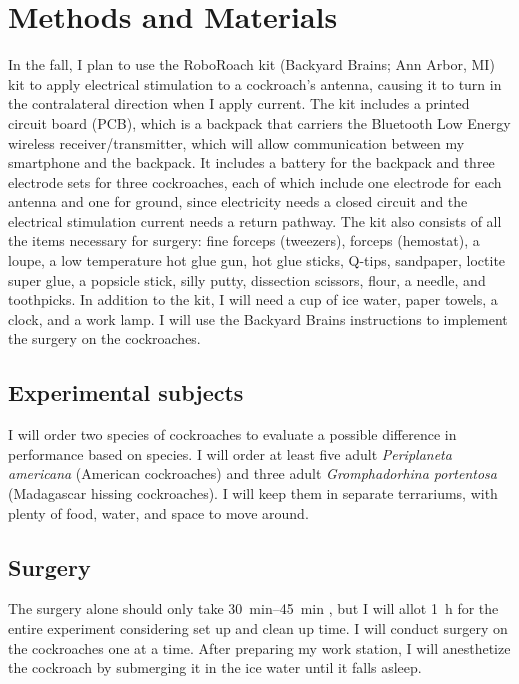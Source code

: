 \section{Methods and Materials}
\label{sec:methods}




In the fall, I plan to use the RoboRoach kit (Backyard Brains; Ann Arbor, MI) kit to apply electrical stimulation to a cockroach's antenna, causing it to turn in the contralateral direction when I apply current. The kit includes a printed circuit board (PCB), which is a backpack that carriers the Bluetooth Low Energy wireless receiver/transmitter, which will allow communication between my smartphone and the backpack. It includes a battery for the backpack and three electrode sets for three cockroaches, each of which include one electrode for each antenna and one for ground, since electricity needs a closed circuit and the electrical stimulation current needs a return pathway. The kit also consists of all the items necessary for surgery: fine forceps (tweezers), forceps (hemostat), a loupe, a low temperature hot glue gun, hot glue sticks, Q-tips, sandpaper, loctite super glue, a popsicle stick, silly putty, dissection scissors, flour, a needle, and toothpicks. In addition to the kit, I will need a cup of ice water, paper towels, a clock, and a work lamp. I will use the Backyard Brains instructions to implement the surgery on the cockroaches.




\subsection{Experimental subjects}
I will order two species of cockroaches to evaluate a possible difference in performance based on species. I will order at least five adult \emph{Periplaneta americana} (American cockroaches) and three adult \emph{Gromphadorhina portentosa} (Madagascar hissing cockroaches). I will keep them in separate terrariums, with plenty of food, water, and space to move around.






\subsection{Surgery}
The surgery alone should only take \SIrange{30}{45}{\minute} , but I will allot \SI{1}{\hour} for the entire experiment considering set up and clean up time. I will conduct surgery on the cockroaches one at a time. After preparing my work station, I will anesthetize the cockroach by submerging it in the ice water until it falls asleep. 

